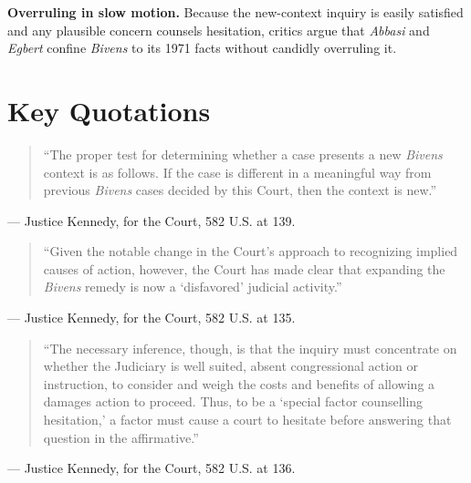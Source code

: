 \documentclass[12pt]{article}
\begin{document}
\textbf{Overruling in slow motion.} Because the new-context inquiry is easily satisfied and any plausible concern counsels hesitation, critics argue that \textit{Abbasi} and \textit{Egbert} confine \textit{Bivens} to its 1971 facts without candidly overruling it.

\section{Key Quotations}

\begin{quote}
``The proper test for determining whether a case presents a new \textit{Bivens} context is as follows. If the case is different in a meaningful way from previous \textit{Bivens} cases decided by this Court, then the context is new.''
\end{quote}
\noindent --- Justice Kennedy, for the Court, 582 U.S. at 139.

\begin{quote}
``Given the notable change in the Court's approach to recognizing implied causes of action, however, the Court has made clear that expanding the \textit{Bivens} remedy is now a `disfavored' judicial activity.''
\end{quote}
\noindent --- Justice Kennedy, for the Court, 582 U.S. at 135.

\begin{quote}
``The necessary inference, though, is that the inquiry must concentrate on whether the Judiciary is well suited, absent congressional action or instruction, to consider and weigh the costs and benefits of allowing a damages action to proceed. Thus, to be a `special factor counselling hesitation,' a factor must cause a court to hesitate before answering that question in the affirmative.''
\end{quote}
\noindent --- Justice Kennedy, for the Court, 582 U.S. at 136.
\end{document}
